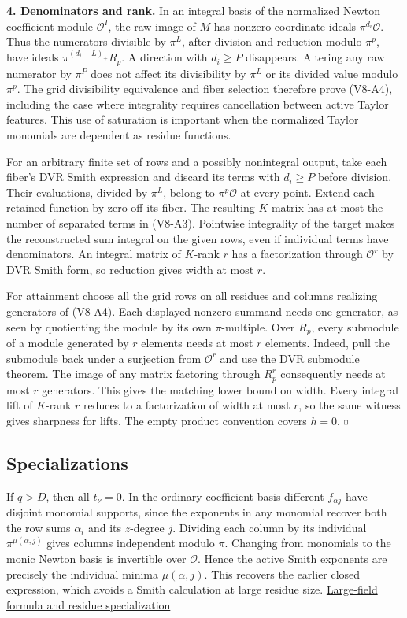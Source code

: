 \documentclass[11pt,a4paper]{article}
\renewcommand{\square}{\mathord{\vcenter{\hbox{\fboxsep=0pt\fboxrule=.4pt\fbox{\rule{0pt}{.7ex}\rule{.7ex}{0pt}}}}}}
\begin{document}
\textbf{4. Denominators and rank.} In an integral basis of the
normalized Newton coefficient module \(\mathcal O^I\), the raw image of
\(M\) has nonzero coordinate ideals \(\pi^{d_i}\mathcal O\). Thus the
numerators divisible by \(\pi^L\), after division and reduction modulo
\(\pi^p\), have ideals \(\pi^{(d_i-L)_+}R_p\). A direction with
\(d_i\ge P\) disappears. Altering any raw numerator by \(\pi^P\) does
not affect its divisibility by \(\pi^L\) or its divided value modulo
\(\pi^p\). The grid divisibility equivalence and fiber selection
therefore prove (V8-A4), including the case where integrality requires
cancellation between active Taylor features. This use of saturation is
important when the normalized Taylor monomials are dependent as residue
functions.

For an arbitrary finite set of rows and a possibly nonintegral output,
take each fiber's DVR Smith expression and discard its terms with
\(d_i\ge P\) before division. Their evaluations, divided by \(\pi^L\),
belong to \(\pi^p\mathcal O\) at every point. Extend each retained
function by zero off its fiber. The resulting \(K\)-matrix has at most
the number of separated terms in (V8-A3). Pointwise integrality of the
target makes the reconstructed sum integral on the given rows, even if
individual terms have denominators. An integral matrix of \(K\)-rank
\(r\) has a factorization through \(\mathcal O^r\) by DVR Smith form, so
reduction gives width at most \(r\).

For attainment choose all the grid rows on all residues and columns
realizing generators of (V8-A4). Each displayed nonzero summand needs one
generator, as seen by quotienting the module by its own
\(\pi\)-multiple. Over \(R_p\), every submodule of a module generated by
\(r\) elements needs at most \(r\) elements. Indeed, pull the submodule
back under a surjection from \(\mathcal O^r\) and use the DVR submodule
theorem. The image of any matrix factoring through \(R_p^r\)
consequently needs at most \(r\) generators. This gives the matching
lower bound on width. Every integral lift of \(K\)-rank \(r\) reduces to
a factorization of width at most \(r\), so the same witness gives
sharpness for lifts. The empty product convention covers \(h=0\).
\(\square\)

\subsection{Specializations}\label{v8-specializations}

If \(q>D\), then all \(t_\nu=0\). In the ordinary coefficient basis
different \(f_{\alpha j}\) have disjoint monomial supports, since the
exponents in any monomial recover both the row sums \(\alpha_i\) and its
\(z\)-degree \(j\). Dividing each column by its individual
\(\pi^{\mu(\alpha,j)}\) gives columns independent modulo \(\pi\).
Changing from monomials to the monic Newton basis is invertible over
\(\mathcal O\). Hence the active Smith exponents are precisely the
individual minima \(\mu(\alpha,j)\). This recovers the earlier closed
expression, which avoids a Smith calculation at large residue size.
\hyperref[v8-section-jet-polynomial-capacity]{Large-field formula and
residue specialization}
\end{document}
